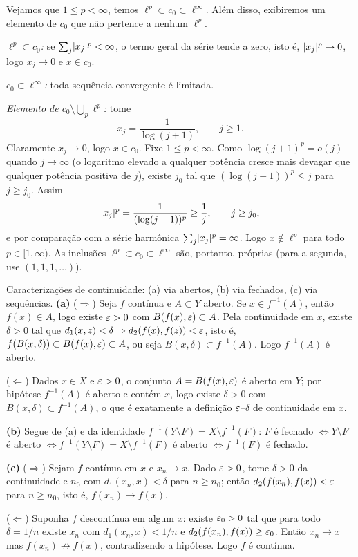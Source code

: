 \begin{exercicio}{Vejamos que $1\le p<\infty$, temos $\ell^p\subset c_0\subset \ell^\infty$. Além disso, exibiremos um 
  elemento de $c_0$ que não pertence a nenhum $\ell^p$.}

\emph{$\ell^p\subset c_0$:} se $\sum_j\lvert x_j\rvert^p<\infty$, o termo geral da série tende a zero, isto é, $\lvert x_j\rvert^p\to0$, logo $x_j\to0$ e $x\in c_0$.

\emph{$c_0\subset \ell^\infty$:} toda sequência convergente é limitada.

\emph{Elemento de $c_0\setminus\bigcup_p \ell^p$:} tome
\[ x_j=\frac{1}{\log(j+1)},\qquad j\ge1. \]
Claramente $x_j\to0$, logo $x\in c_0$. Fixe $1\le p<\infty$. Como $\log(j+1)^p = o(j)$ quando $j\to\infty$ (o logaritmo elevado a qualquer potência cresce mais devagar que qualquer potência positiva de $j$), existe $j_0$ tal que $(\log(j+1))^p\le j$ para $j\ge j_0$. Assim
\[ \lvert x_j\rvert^p=\frac{1}{(\log(j+1))^p}\ge\frac{1}{j},\qquad j\ge j_0, \]
e por comparação com a série harmônica $\sum_j\lvert x_j\rvert^p=\infty$. Logo $x\notin \ell^p$ para todo $p\in[1,\infty)$. As inclusões $\ell^p\subset c_0\subset \ell^\infty$ são, portanto, próprias (para a segunda, use $(1,1,1,\dots)$).
\end{exercicio}

\begin{exercicio}{Caracterizações de continuidade: (a) via abertos, (b) via fechados, (c) via sequências.}
\sol
\textbf{(a)} ($\Rightarrow$) Seja $f$ contínua e $A\subset Y$ aberto. Se $x\in f^{-1}(A)$, então $f(x)\in A$, logo existe $\varepsilon>0$ com $B(f(x),\varepsilon)\subset A$. Pela continuidade em $x$, existe $\delta>0$ tal que $d_1(x,z)<\delta \Rightarrow d_2(f(x),f(z))<\varepsilon$, isto é, $f(B(x,\delta))\subset B(f(x),\varepsilon)\subset A$, ou seja $B(x,\delta)\subset f^{-1}(A)$. Logo $f^{-1}(A)$ é aberto.

($\Leftarrow$) Dados $x\in X$ e $\varepsilon>0$, o conjunto $A=B(f(x),\varepsilon)$ é aberto em $Y$; por hipótese $f^{-1}(A)$ é aberto e contém $x$, logo existe $\delta>0$ com $B(x,\delta)\subset f^{-1}(A)$, o que é exatamente a definição $\varepsilon$--$\delta$ de continuidade em $x$.

\textbf{(b)} Segue de (a) e da identidade $f^{-1}(Y\setminus F)=X\setminus f^{-1}(F)$: $F$ é fechado $\iff Y\setminus F$ é aberto $\iff f^{-1}(Y\setminus F)=X\setminus f^{-1}(F)$ é aberto $\iff f^{-1}(F)$ é fechado.

\textbf{(c)} ($\Rightarrow$) Sejam $f$ contínua em $x$ e $x_n\to x$. Dado $\varepsilon>0$, tome $\delta>0$ da continuidade e $n_0$ com $d_1(x_n,x)<\delta$ para $n\ge n_0$; então $d_2(f(x_n),f(x))<\varepsilon$ para $n\ge n_0$, isto é, $f(x_n)\to f(x)$.

($\Leftarrow$) Suponha $f$ descontínua em algum $x$: existe $\varepsilon_0>0$ tal que para todo $\delta=1/n$ existe $x_n$ com $d_1(x_n,x)<1/n$ e $d_2(f(x_n),f(x))\ge\varepsilon_0$. Então $x_n\to x$ mas $f(x_n)\not\to f(x)$, contradizendo a hipótese. Logo $f$ é contínua.
\end{exercicio}

